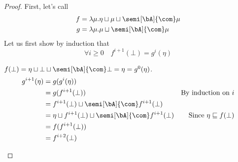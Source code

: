 \begin{proof}
  First, let's call
  \begin{align*}
    f & = \lambda \mu . \eta \sqcup \mu \sqcup \semi[\bA]{\com}\mu \\
    g & = \lambda \mu . \mu \sqcup \semi[\bA]{\com}\mu
  \end{align*}
  Let us first show by induction that 
  \begin{equation}\label{prop2}
    \forall i\geq 0 \quad f^{i+1} (\bot) = g^{i} (\eta) \tag{\(\sharp\)}
  \end{equation}

  \noindent
  \begin{inductive}
     \(f(\bot) = \eta \sqcup \bot \sqcup \semi[\bA]{\com}\bot = \eta = g^0 (\eta)\).
    \begin{align*}
      g^{i+1}(\eta) & = g (g^i (\eta)) \\
                    & = g(f^{i+1}(\bot)) & \text{By induction on } i \\
                    & = f^{i+1}(\bot) \sqcup \semi[\bA]{\com}f^{i+1}(\bot) \\
                    & = \eta \sqcup f^{i+1}(\bot) \sqcup \semi[\bA]{\com}f^{i+1}(\bot) & \text{Since } \eta \sqsubseteq f(\bot)\\
                    & = f ( f^{i+1}(\bot)) \\
                    & = f^{i+2}(\bot)
    \end{align*}
  \end{inductive}
  

\end{proof}
